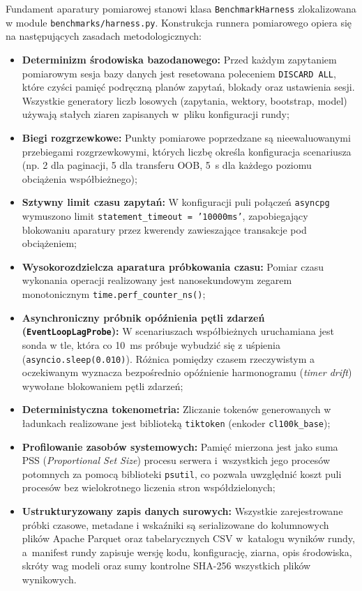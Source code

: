 Fundament aparatury pomiarowej stanowi klasa \texttt{BenchmarkHarness} zlokalizowana w module \texttt{benchmarks/harness.py}. Konstrukcja runnera pomiarowego opiera się na następujących zasadach metodologicznych:
\begin{itemize}
    \item \textbf{Determinizm środowiska bazodanowego:} Przed każdym zapytaniem pomiarowym sesja bazy danych jest resetowana poleceniem \texttt{DISCARD ALL}, które czyści pamięć podręczną planów zapytań, blokady oraz ustawienia sesji. Wszystkie generatory liczb losowych (zapytania, wektory, bootstrap, model) używają stałych ziaren zapisanych w~pliku konfiguracji rundy;
    \item \textbf{Biegi rozgrzewkowe:} Punkty pomiarowe poprzedzane są nieewaluowanymi przebiegami rozgrzewkowymi, których liczbę określa konfiguracja scenariusza (np. 2 dla paginacji, 5 dla transferu OOB, 5~s dla każdego poziomu obciążenia współbieżnego);
    \item \textbf{Sztywny limit czasu zapytań:} W konfiguracji puli połączeń \texttt{asyncpg} wymuszono limit \texttt{statement\_timeout = '10000ms'}, zapobiegający blokowaniu aparatury przez kwerendy zawieszające transakcje pod obciążeniem;
    \item \textbf{Wysokorozdzielcza aparatura próbkowania czasu:} Pomiar czasu wykonania operacji realizowany jest nanosekundowym zegarem monotonicznym \texttt{time.perf\_counter\_ns()};
    \item \textbf{Asynchroniczny próbnik opóźnienia pętli zdarzeń (\texttt{EventLoopLagProbe}):} W scenariuszach współbieżnych uruchamiana jest sonda w tle, która co 10~ms próbuje wybudzić się z uśpienia (\texttt{asyncio.sleep(0.010)}). Różnica pomiędzy czasem rzeczywistym a oczekiwanym wyznacza bezpośrednio opóźnienie harmonogramu (\emph{timer drift}) wywołane blokowaniem pętli zdarzeń;
    \item \textbf{Deterministyczna tokenometria:} Zliczanie tokenów generowanych w ładunkach realizowane jest biblioteką \texttt{tiktoken} (enkoder \texttt{cl100k\_base});
    \item \textbf{Profilowanie zasobów systemowych:} Pamięć mierzona jest jako suma PSS (\emph{Proportional Set Size}) procesu serwera i~wszystkich jego procesów potomnych za pomocą biblioteki \texttt{psutil}, co pozwala uwzględnić koszt puli procesów bez wielokrotnego liczenia stron współdzielonych;
    \item \textbf{Ustrukturyzowany zapis danych surowych:} Wszystkie zarejestrowane próbki czasowe, metadane i wskaźniki są serializowane do kolumnowych plików Apache Parquet oraz tabelarycznych CSV w~katalogu wyników rundy, a~manifest rundy zapisuje wersję kodu, konfigurację, ziarna, opis środowiska, skróty wag modeli oraz sumy kontrolne SHA-256 wszystkich plików wynikowych.
\end{itemize}

